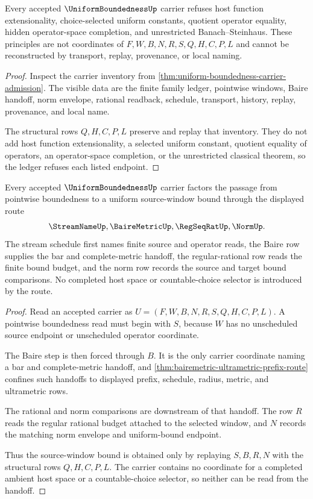 \begin{theorem}
\label{thm:uniform-boundedness-ledger-refusal}
Every accepted $\UniformBoundednessUp$ carrier refuses host function extensionality, choice-selected uniform constants, quotient operator equality, hidden operator-space completion, and unrestricted Banach--Steinhaus. These principles are not coordinates of $F,W,B,N,R,S,Q,H,C,P,L$ and cannot be reconstructed by transport, replay, provenance, or local naming.
\end{theorem}
\begin{proof}
Inspect the carrier inventory from \autoref{thm:uniform-boundedness-carrier-admission}. The visible data are the finite family ledger, pointwise windows, Baire handoff, norm envelope, rational readback, schedule, transport, history, replay, provenance, and local name.

The structural rows $Q,H,C,P,L$ preserve and replay that inventory. They do not add host function extensionality, a selected uniform constant, quotient equality of operators, an operator-space completion, or the unrestricted classical theorem, so the ledger refuses each listed endpoint.
\end{proof}

\begin{theorem}
\label{thm:uniform-boundedness-baire-handoff}
Every accepted $\UniformBoundednessUp$ carrier factors the passage from pointwise boundedness to a uniform source-window bound through the displayed route
$$
\StreamNameUp,\BaireMetricUp,\RegSeqRatUp,\NormUp .
$$
The stream schedule first names finite source and operator reads, the Baire row supplies the bar and complete-metric handoff, the regular-rational row reads the finite bound budget, and the norm row records the source and target bound comparisons. No completed host space or countable-choice selector is introduced by the route.
\end{theorem}
\begin{proof}
Read an accepted carrier as $U=(F,W,B,N,R,S,Q,H,C,P,L)$. A pointwise boundedness read must begin with $S$, because $W$ has no unscheduled source endpoint or unscheduled operator coordinate.

The Baire step is then forced through $B$. It is the only carrier coordinate naming a bar and complete-metric handoff, and \autoref{thm:bairemetric-ultrametric-prefix-route} confines such handoffs to displayed prefix, schedule, radius, metric, and ultrametric rows.

The rational and norm comparisons are downstream of that handoff. The row $R$ reads the regular rational budget attached to the selected window, and $N$ records the matching norm envelope and uniform-bound endpoint.

Thus the source-window bound is obtained only by replaying $S,B,R,N$ with the structural rows $Q,H,C,P,L$. The carrier contains no coordinate for a completed ambient host space or a countable-choice selector, so neither can be read from the handoff.
\end{proof}

